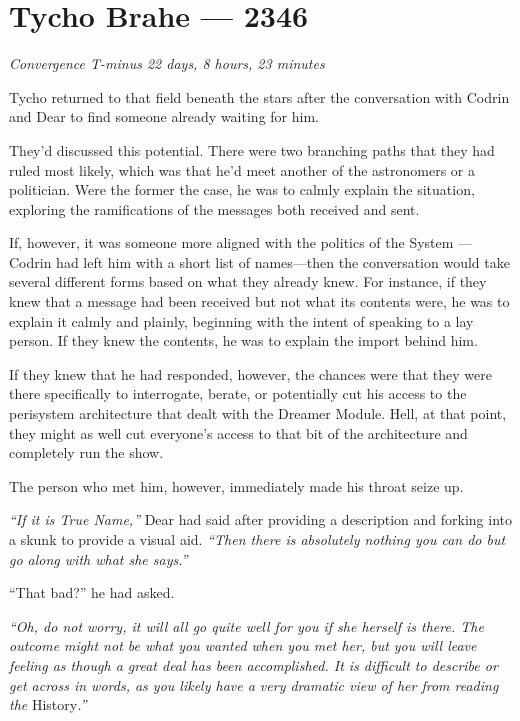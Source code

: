 \hypertarget{tycho-brahe-2346}{%
\chapter{Tycho Brahe — 2346}}

\begin{center}
\emph{Convergence T-minus 22 days, 8 hours, 23 minutes}
\end{center}

\noindent Tycho returned to that field beneath the stars after the conversation with Codrin and Dear to find someone already waiting for him.

They'd discussed this potential. There were two branching paths that they had ruled most likely, which was that he'd meet another of the astronomers or a politician. Were the former the case, he was to calmly explain the situation, exploring the ramifications of the messages both received and sent.

If, however, it was someone more aligned with the politics of the System — Codrin had left him with a short list of names—then the conversation would take several different forms based on what they already knew. For instance, if they knew that a message had been received but not what its contents were, he was to explain it calmly and plainly, beginning with the intent of speaking to a lay person. If they knew the contents, he was to explain the import behind him.

If they knew that he had responded, however, the chances were that they were there specifically to interrogate, berate, or potentially cut his access to the perisystem architecture that dealt with the Dreamer Module. Hell, at that point, they might as well cut everyone's access to that bit of the architecture and completely run the show.

The person who met him, however, immediately made his throat seize up.

\emph{``If it is True Name,''} Dear had said after providing a description and forking into a skunk to provide a visual aid. \emph{``Then there is absolutely nothing you can do but go along with what she says.''}

``That bad?'' he had asked.

\emph{``Oh, do not worry, it will all go quite well for you if she herself is there. The outcome might not be what you wanted when you met her, but you will leave feeling as though a great deal has been accomplished. It is difficult to describe or get across in words, as you likely have a very dramatic view of her from reading the} History\emph{.''}

